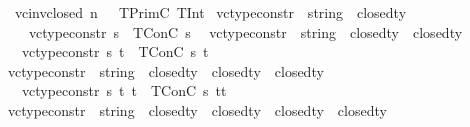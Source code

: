 \begin{isabellebody}
\ {\isacharbar}{\kern0pt}\ {\isachardoublequoteopen}vc{\isacharunderscore}{\kern0pt}inv{\isacharunderscore}{\kern0pt}closed\ n\ {\isacharunderscore}{\kern0pt}\ {\isacharequal}{\kern0pt}\ TPrimC\ {\isacharparenleft}{\kern0pt}TInt{\isacharparenright}{\kern0pt}{\isachardoublequoteclose}\isanewline
\isanewline
\isanewline
{}\isamarkupfalse%
\ vc{\isacharunderscore}{\kern0pt}type{\isacharunderscore}{\kern0pt}constr{}\ {\isacharcolon}{\kern0pt}{\isacharcolon}{\kern0pt}\ {\isachardoublequoteopen}string\ {\isasymRightarrow}\ closed{\isacharunderscore}{\kern0pt}ty{\isachardoublequoteclose}\isanewline
\ \ \isanewline
\ \ \ \ {\isachardoublequoteopen}vc{\isacharunderscore}{\kern0pt}type{\isacharunderscore}{\kern0pt}constr{}\ s\ {\isacharequal}{\kern0pt}\ TConC\ s\ {\isacharbrackleft}{\kern0pt}{\isacharbrackright}{\kern0pt}{\isachardoublequoteclose}\isanewline
\isanewline
{}\isamarkupfalse%
\ vc{\isacharunderscore}{\kern0pt}type{\isacharunderscore}{\kern0pt}constr{}\ {\isacharcolon}{\kern0pt}{\isacharcolon}{\kern0pt}\ {\isachardoublequoteopen}string\ {\isasymRightarrow}\ closed{\isacharunderscore}{\kern0pt}ty\ {\isasymRightarrow}\ closed{\isacharunderscore}{\kern0pt}ty{\isachardoublequoteclose}\isanewline
\ \ \isanewline
\ \ \ {\isachardoublequoteopen}vc{\isacharunderscore}{\kern0pt}type{\isacharunderscore}{\kern0pt}constr{}\ s\ t\ {\isacharequal}{\kern0pt}\ TConC\ s\ {\isacharbrackleft}{\kern0pt}t{\isacharbrackright}{\kern0pt}{\isachardoublequoteclose}\isanewline
\isanewline
{}\isamarkupfalse%
\ vc{\isacharunderscore}{\kern0pt}type{\isacharunderscore}{\kern0pt}constr{}\ {\isacharcolon}{\kern0pt}{\isacharcolon}{\kern0pt}\ {\isachardoublequoteopen}string\ {\isasymRightarrow}\ closed{\isacharunderscore}{\kern0pt}ty\ {\isasymRightarrow}\ closed{\isacharunderscore}{\kern0pt}ty\ {\isasymRightarrow}\ closed{\isacharunderscore}{\kern0pt}ty{\isachardoublequoteclose}\isanewline
\ \ \isanewline
\ \ \ {\isachardoublequoteopen}vc{\isacharunderscore}{\kern0pt}type{\isacharunderscore}{\kern0pt}constr{}\ s\ t{}\ t{}\ {\isacharequal}{\kern0pt}\ TConC\ s\ {\isacharbrackleft}{\kern0pt}t{}{\isacharcomma}{\kern0pt}t{}{\isacharbrackright}{\kern0pt}{\isachardoublequoteclose}\isanewline
\isanewline
{}\isamarkupfalse%
\ vc{\isacharunderscore}{\kern0pt}type{\isacharunderscore}{\kern0pt}constr{}\ {\isacharcolon}{\kern0pt}{\isacharcolon}{\kern0pt}\ {\isachardoublequoteopen}string\ {\isasymRightarrow}\ closed{\isacharunderscore}{\kern0pt}ty\ {\isasymRightarrow}\ closed{\isacharunderscore}{\kern0pt}ty\ {\isasymRightarrow}\ closed{\isacharunderscore}{\kern0pt}ty\ {\isasymRightarrow}\ closed{\isacharunderscore}{\kern0pt}ty{\isachardoublequoteclose}\isanewline

\end{isabellebody}
